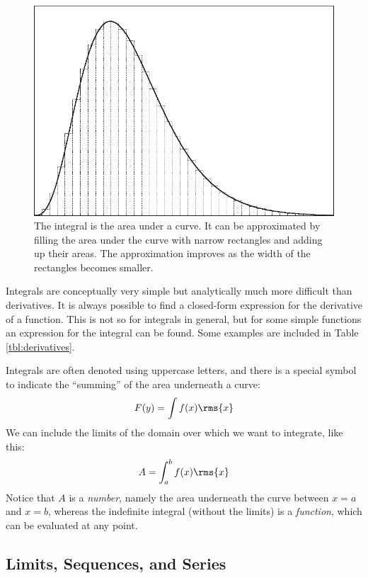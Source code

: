\begin{figure}
  \centerline{\includegraphics{img/integral}}
  \caption{The integral is the area under a curve. It can be
    approximated by filling the area under the curve with narrow
    rectangles and adding up their areas.  The approximation improves
    as the width of the rectangles becomes smaller.}
  \label{fig:integral}
\end{figure}\pagebreak

Integrals are conceptually very simple but analytically much more
difficult than derivatives. It is always possible to find a
closed-form expression for the derivative of a function. This is not
so for integrals in general, but for some simple functions an
expression for the integral can be found. Some examples are included
in Table \ref{tbl:derivatives}.

Integrals are often denoted using uppercase letters, and there is a
special symbol to indicate the ``summing'' of the area underneath a
curve:
%
\[
F(y) = \int f(x) \rms{x}
\]
%
We can include the limits of the domain over which we want to
integrate, like this:
%
\[
A = \int_a^b f(x) \rms{x}
\]
%
Notice that $A$ is a \emph{number}, namely the area underneath the
curve between $x=a$ and $x=b$, whereas the indefinite integral
(without the limits) is a \emph{function}, which can be evaluated at
any point.
  
\subsection{Limits, Sequences, and Series}

